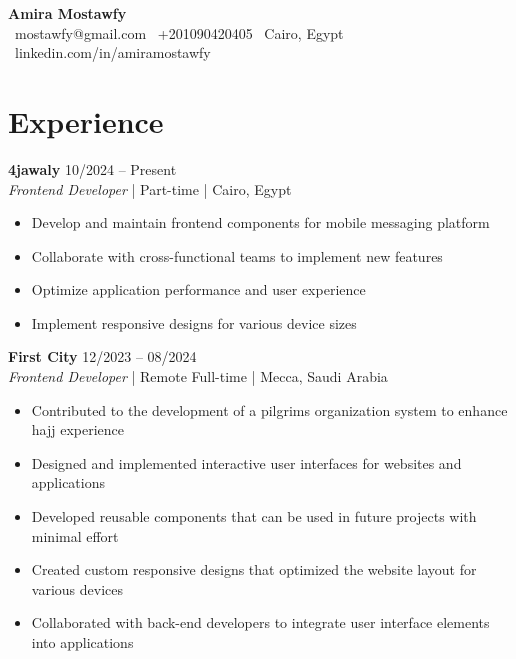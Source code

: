 \documentclass[11pt,a4paper]{article}
\begin{document}
\begin{center}
{\Huge\textbf{Amira Mostawfy}}\\[0.5em]
\faEnvelope\ mostawfy@gmail.com \quad
\faPhone\ +201090420405 \quad
\faMapMarker\ Cairo, Egypt \quad
\faLinkedin\ linkedin.com/in/amiramostawfy
\end{center}

\section*{Experience}

\noindent\textbf{4jawaly} \hfill 10/2024 -- Present\\
\textit{Frontend Developer} | Part-time | Cairo, Egypt\\
\vspace{-1em}
\begin{itemize}
    \item Develop and maintain frontend components for mobile messaging platform
    \item Collaborate with cross-functional teams to implement new features
    \item Optimize application performance and user experience
    \item Implement responsive designs for various device sizes
\end{itemize}

\vspace{0.2cm}

\noindent\textbf{First City} \hfill 12/2023 -- 08/2024\\
\textit{Frontend Developer} | Remote Full-time | Mecca, Saudi Arabia\\
\vspace{-1em}
\begin{itemize}
    \item Contributed to the development of a pilgrims organization system to enhance hajj experience
    \item Designed and implemented interactive user interfaces for websites and applications
    \item Developed reusable components that can be used in future projects with minimal effort
    \item Created custom responsive designs that optimized the website layout for various devices
    \item Collaborated with back-end developers to integrate user interface elements into applications
\end{itemize}
\end{document}
